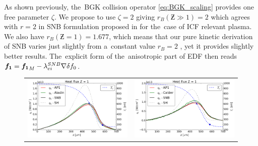 As shown previously, the~BGK collision operator \eqref{eq:BGK_scaling}
provides one free parameter $\zeta$.
We propose to use $\zeta = 2$ giving $r_B(\Zbar\gg1) = 2$ which agrees 
with $r=2$ in SNB formulation proposed in \cite{Brodrick_PoP2017} 
for the~case of ICF relevant plasma. We also have $r_B(\Zbar = 1) = 1.677$,
which means that our pure kinetic derivation of SNB varies just slightly
from a~constant value $r_B=2$ \cite{Brodrick_PoP2017}, yet it provides 
slightly better results. The~explicit form of the~anisotropic 
part of EDF then reads ${\boldsymbol{f_1}} = {\boldsymbol{f_1}}_M - \lambda_{ei}^{SNB}\nabla\delta f_0$.

\begin{figure}[htb]
  \begin{center}
    \begin{tabular}{cc}
      \includegraphics[width=\figscale\textwidth]{../VFPdata/C7_Aladin_case5_heatflux.png} 
	  &
      \includegraphics[width=\figscale\textwidth]{../VFPdata/C7_Calder_case5_heatflux.png} 
	  \\ 

\end{tabular}
\end{center}
\end{figure}
